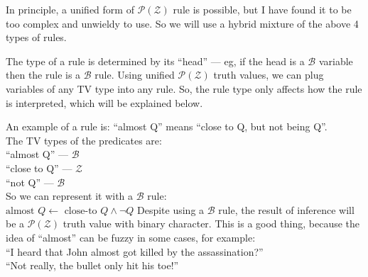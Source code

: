 \documentclass[a4paper]{report}
\begin{document}
In principle, a unified form of $\mathcal{P(Z)}$ rule is possible, but I have found it to be too complex and unwieldy to use.  So we will use a hybrid mixture of the above 4 types of rules.


The type of a rule is determined by its ``head'' --- eg, if the head is a $\mathcal{B}$ variable then the rule is a $\mathcal{B}$ rule.  Using unified $\mathcal{P(Z)}$ truth values, we can plug variables of any TV type into any rule.  So, the rule type only affects how the rule is interpreted, which will be explained below.


An example of a rule is:  ``almost Q'' means ``close to Q, but not being Q''.\\
The TV types of the predicates are:\\
\hspace*{1cm} ``almost Q'' --- $\mathcal{B}$\\
\hspace*{1cm} ``close to Q'' --- $\mathcal{Z}$\\
\hspace*{1cm} ``not Q'' --- $\mathcal{B}$\\
So we can represent it with a $\mathcal{B}$ rule:\\
\hspace*{1cm} $\mbox{almost } Q \leftarrow \mbox{ close-to } Q \wedge \neg Q$
Despite using a $\mathcal{B}$ rule, the result of inference will be a $\mathcal{P(Z)}$ truth value with binary character.  This is a good thing, because the idea of ``almost'' can be fuzzy in some cases, for example:\\
\hspace*{1cm} ``I heard that John almost got killed by the assassination?''\\
\hspace*{1cm} ``Not really, the bullet only hit his toe!''


\end{document}
